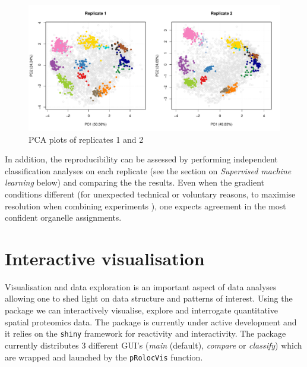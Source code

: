 \begin{figure}[!ht]
  \centering
\begin{knitrout}
\color{fgcolor}\begin{kframe}
\begin{alltt}
\hlstd{(} \hlstd{=} \hlstd{(}\hlstd{,} \hlstd{))}
\hlstd{(hl[, hl}\hlopt{$} \hlopt{==} \hlstd{],}  \hlstd{=} \hlstd{)}
\hlstd{(hl[, hl}\hlopt{$} \hlopt{==} \hlstd{],}  \hlstd{=} \hlstd{,}  \hlstd{=} \hlstd{)}
\end{alltt}
\end{kframe}
\includegraphics[width=\textwidth]{figure/plot2Drep-1} 

\end{knitrout}
  \caption{PCA plots of replicates 1 and 2}
  \label{fig:plot2Drep}
\end{figure}

In addition, the reproducibility can be assessed by performing
independent classification analyses on each replicate (see the section
on \textit{Supervised machine learning} below) and comparing the the
results. Even when the gradient conditions different (for unexpected
technical or voluntary reasons, to maximise resolution when combining
experiments \cite{Trotter:2010}), one expects agreement in the most
confident organelle assignments.

\pagebreak

\section*{Interactive visualisation}

Visualisation and data exploration is an important aspect of data
analyses allowing one to shed light on data structure and patterns of
interest. Using the  package we can interactively
visualise, explore and interrogate quantitative spatial proteomics
data. The  package is currently under active
development and it relies on the \texttt{shiny} framework for
reactivity and interactivity. The package currently distributes 3
different GUI's (\textit{main} (default), \textit{compare} or
\textit{classify}) which are wrapped and launched by the
\texttt{pRolocVis} function. 


